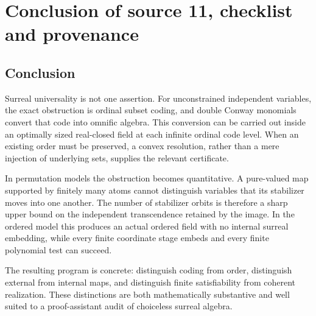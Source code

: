 \documentclass[11pt,letterpaper]{article}
\theoremstyle{definition}
\theoremstyle{remark}
\begin{document}
\section{Conclusion of source 11, checklist and provenance}
\label{hset:kw:sec:provenance}

\subsection{Conclusion}
Surreal universality is not one assertion. For unconstrained independent variables, the exact obstruction is ordinal subset coding, and double Conway monomials convert that code into omnific algebra. This conversion can be carried out inside an optimally sized real-closed field at each infinite ordinal code level. When an existing order must be preserved, a convex resolution, rather than a mere injection of underlying sets, supplies the relevant certificate.

In permutation models the obstruction becomes quantitative. A pure-valued map supported by finitely many atoms cannot distinguish variables that its stabilizer moves into one another. The number of stabilizer orbits is therefore a sharp upper bound on the independent transcendence retained by the image. In the ordered model this produces an actual ordered field with no internal surreal embedding, while every finite coordinate stage embeds and every finite polynomial test can succeed.

The resulting program is concrete: distinguish coding from order, distinguish external from internal maps, and distinguish finite satisfiability from coherent realization. These distinctions are both mathematically substantive and well suited to a proof-assistant audit of choiceless surreal algebra.
\end{document}
